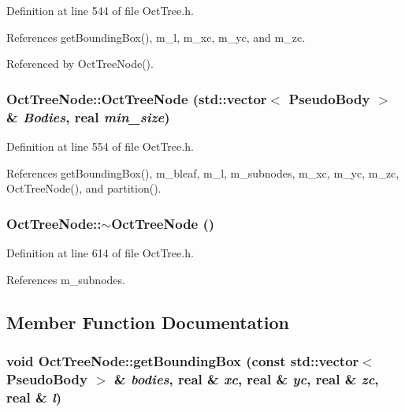 Definition at line 544 of file OctTree.h.



References getBoundingBox(), m\_\-l, m\_\-xc, m\_\-yc, and m\_\-zc.



Referenced by OctTreeNode().

\subsubsection[{OctTreeNode}]{\setlength{\rightskip}{0pt plus 5cm}OctTreeNode::OctTreeNode (std::vector$<$ {\bf PseudoBody} $>$ \& {\em Bodies}, \/  {\bf real} {\em min\_\-size})}\label{classOctTreeNode_a1bfe8b77ca90832454010d5e1a06aec0}


Definition at line 554 of file OctTree.h.



References getBoundingBox(), m\_\-bleaf, m\_\-l, m\_\-subnodes, m\_\-xc, m\_\-yc, m\_\-zc, OctTreeNode(), and partition().

\subsubsection[{$\sim$OctTreeNode}]{\setlength{\rightskip}{0pt plus 5cm}OctTreeNode::$\sim$OctTreeNode ()}\label{classOctTreeNode_a6d6f8ebcf5b873195ea89ae4c0597fab}


Definition at line 614 of file OctTree.h.



References m\_\-subnodes.



\subsection{Member Function Documentation}
\subsubsection[{getBoundingBox}]{\setlength{\rightskip}{0pt plus 5cm}void OctTreeNode::getBoundingBox (const std::vector$<$ {\bf PseudoBody} $>$ \& {\em bodies}, \/  {\bf real} \& {\em xc}, \/  {\bf real} \& {\em yc}, \/  {\bf real} \& {\em zc}, \/  {\bf real} \& {\em l})}\label{classOctTreeNode_a8a0338ba7c40a65744ed5bfec17bd80c}



